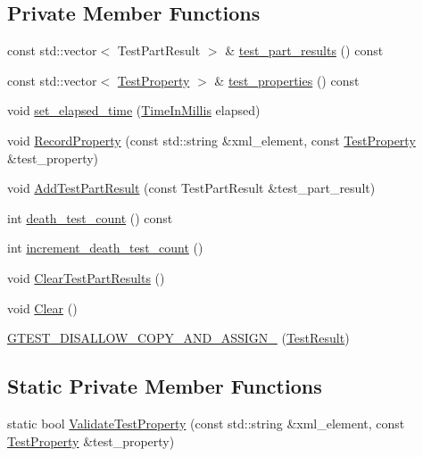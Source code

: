 \subsection*{Private Member Functions}
\begin{DoxyCompactItemize}
\item 
const std\+::vector$<$ Test\+Part\+Result $>$ \& \hyperlink{classtesting_1_1TestResult_a2964c3a12ef6ef9bcb47599374514432}{test\+\_\+part\+\_\+results} () const
\item 
const std\+::vector$<$ \hyperlink{classtesting_1_1TestProperty}{Test\+Property} $>$ \& \hyperlink{classtesting_1_1TestResult_a8c94e8e89c616abe5d33024a6b54f218}{test\+\_\+properties} () const
\item 
void \hyperlink{classtesting_1_1TestResult_aa345325e5dea41609d17d7c614bf2b18}{set\+\_\+elapsed\+\_\+time} (\hyperlink{namespacetesting_a992de1d091ce660f451d1e8b3ce30fd6}{Time\+In\+Millis} elapsed)
\item 
void \hyperlink{classtesting_1_1TestResult_ac253b0fd7ea70f457e9517e415eac32d}{Record\+Property} (const std\+::string \&xml\+\_\+element, const \hyperlink{classtesting_1_1TestProperty}{Test\+Property} \&test\+\_\+property)
\item 
void \hyperlink{classtesting_1_1TestResult_ac28e9821ad3e9314c4fe41b119c5b44d}{Add\+Test\+Part\+Result} (const Test\+Part\+Result \&test\+\_\+part\+\_\+result)
\item 
int \hyperlink{classtesting_1_1TestResult_a827cb78135ac375d81d89ffedc3eca52}{death\+\_\+test\+\_\+count} () const
\item 
int \hyperlink{classtesting_1_1TestResult_a07faaa1d16a991f34222d02e10c75dc2}{increment\+\_\+death\+\_\+test\+\_\+count} ()
\item 
void \hyperlink{classtesting_1_1TestResult_aa11ed718e0a76a39e6380e5ddce7cae2}{Clear\+Test\+Part\+Results} ()
\item 
void \hyperlink{classtesting_1_1TestResult_a5371bc2e69435b4cb1fdad9ca81759a6}{Clear} ()
\item 
\hyperlink{classtesting_1_1TestResult_ad04e1d5d9eb623ba1d9fc82cdff43af4}{G\+T\+E\+S\+T\+\_\+\+D\+I\+S\+A\+L\+L\+O\+W\+\_\+\+C\+O\+P\+Y\+\_\+\+A\+N\+D\+\_\+\+A\+S\+S\+I\+G\+N\+\_\+} (\hyperlink{classtesting_1_1TestResult}{Test\+Result})
\end{DoxyCompactItemize}
\subsection*{Static Private Member Functions}
\begin{DoxyCompactItemize}
\item 
static bool \hyperlink{classtesting_1_1TestResult_a01f4ffb668d3b2ffa9b1a11e7045001e}{Validate\+Test\+Property} (const std\+::string \&xml\+\_\+element, const \hyperlink{classtesting_1_1TestProperty}{Test\+Property} \&test\+\_\+property)
\end{DoxyCompactItemize}
